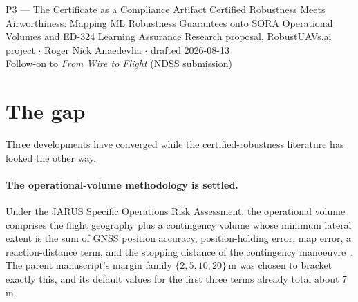\documentclass[11pt,a4paper]{article}
\begin{document}
\proposalheader
  {P3 --- The Certificate as a Compliance Artifact}
  {Certified Robustness Meets Airworthiness: Mapping ML Robustness Guarantees
   onto SORA Operational Volumes and ED-324 Learning Assurance}
  {Research proposal, RobustUAVs.ai project $\cdot$ Roger Nick Anaedevha $\cdot$
   drafted 2026-08-13\\
   Follow-on to \emph{From Wire to Flight} (NDSS submission)}

\begin{abstract}
\noindent
The parent manuscript already computes quantities that aviation regulators
independently require, and does not say so loudly enough. Its corridor-margin
family was chosen to bracket the JARUS SORA contingency volume; its certified
tube radius is directly comparable to that volume's lateral extent; and the
``operating region'' qualifier on its Lipschitz hypothesis is, in the vocabulary
of EASA's learning-assurance framework, an Operational Design Domain. This
proposal formalises the correspondence, performs a gap analysis against the
ED-324 learning-assurance objectives, and delivers an evidence generator that
emits a SORA-shaped compliance pack from a certified run. It is a
systematisation-and-tooling contribution, and is proposed as such.
\end{abstract}

\section{The gap}
Three developments have converged while the certified-robustness literature has
looked the other way.

\paragraph{The operational-volume methodology is settled.}
Under the JARUS Specific Operations Risk Assessment, the operational volume
comprises the flight geography plus a contingency volume whose minimum lateral
extent is the sum of GNSS position accuracy, position-holding error, map error,
a reaction-distance term, and the stopping distance of the contingency
manoeuvre~\cite{jarus_sora25}. The parent manuscript's margin family
$\{2,5,10,20\}$\,m was chosen to bracket exactly this, and its default values
for the first three terms already total about $7$\,m.
\end{document}
